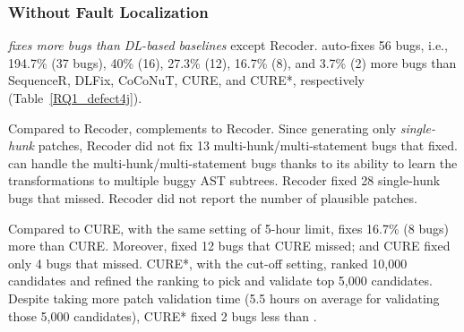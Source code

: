 \subsubsection{{\bf Without Fault Localization}}

{\em {\tool} fixes more bugs than DL-based baselines} except
Recoder. {\tool} auto-fixes 56 bugs, i.e., 194.7\% (37 bugs), 40\%
(16), 27.3\% (12), 16.7\% (8), and 3.7\% (2) more bugs than
Sequen\-ceR, DLFix, CoCoNuT, CURE, and CURE*, respectively
(Table~\ref{RQ1_defect4j}).

Compared to Recoder, {\tool} complements to Recoder. Since
generating only {\em single-hunk} patches, Recoder did not fix 13
multi-hunk/multi-statement bugs that {\tool} fixed.
%
{\tool} can handle the multi-hunk/multi-statement bugs thanks to its
ability to learn the transformations to multiple buggy AST subtrees.
%
Recoder fixed 28 single-hunk bugs that {\tool} missed. Recoder did not
report the number of plausible patches.


Compared to CURE, with the same setting of 5-hour limit, {\tool} fixes
16.7\% (8 bugs) more than CURE. Moreover, {\tool} fixed 12 bugs that
CURE missed; and CURE fixed only 4 bugs that {\tool} missed.
%
CURE*, with the cut-off setting, ranked 10,000 candidates and refined
the ranking to pick and validate top 5,000 candidates. Despite taking
more patch validation time (5.5 hours on average for
validating those 5,000 candidates), CURE* fixed 2 bugs less than
{\tool}.



